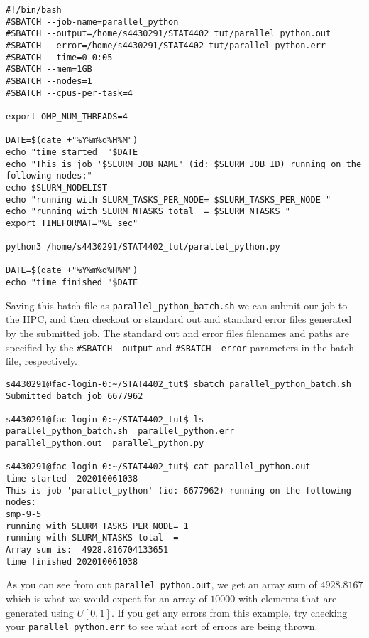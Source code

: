 \begin{verbatim}
#!/bin/bash
#SBATCH --job-name=parallel_python
#SBATCH --output=/home/s4430291/STAT4402_tut/parallel_python.out
#SBATCH --error=/home/s4430291/STAT4402_tut/parallel_python.err
#SBATCH --time=0-0:05
#SBATCH --mem=1GB
#SBATCH --nodes=1
#SBATCH --cpus-per-task=4

export OMP_NUM_THREADS=4

DATE=$(date +"%Y%m%d%H%M")
echo "time started  "$DATE
echo "This is job '$SLURM_JOB_NAME' (id: $SLURM_JOB_ID) running on the following nodes:"
echo $SLURM_NODELIST
echo "running with SLURM_TASKS_PER_NODE= $SLURM_TASKS_PER_NODE "
echo "running with SLURM_NTASKS total  = $SLURM_NTASKS "
export TIMEFORMAT="%E sec"

python3 /home/s4430291/STAT4402_tut/parallel_python.py

DATE=$(date +"%Y%m%d%H%M")
echo "time finished "$DATE
\end{verbatim}
Saving this batch file as \texttt{parallel\_python\_batch.sh} we can submit our job to the HPC, and then checkout or standard out and standard error files generated by the submitted job. The standard out and error files filenames and paths are specified by the \texttt{\#SBATCH --output} and \texttt{\#SBATCH --error} parameters in the batch file, respectively.
\begin{verbatim}
s4430291@fac-login-0:~/STAT4402_tut$ sbatch parallel_python_batch.sh 
Submitted batch job 6677962

s4430291@fac-login-0:~/STAT4402_tut$ ls
parallel_python_batch.sh  parallel_python.err  
parallel_python.out  parallel_python.py

s4430291@fac-login-0:~/STAT4402_tut$ cat parallel_python.out 
time started  202010061038
This is job 'parallel_python' (id: 6677962) running on the following nodes:
smp-9-5
running with SLURM_TASKS_PER_NODE= 1 
running with SLURM_NTASKS total  =  
Array sum is:  4928.816704133651
time finished 202010061038
\end{verbatim}
As you can see from out \texttt{parallel\_python.out}, we get an array sum of $4928.8167$ which is what we would expect for an array of $10000$ with elements that are generated using $U \left[ 0,1 \right]$. If you get any errors from this example, try checking your \texttt{parallel\_python.err} to see what sort of errors are being thrown.